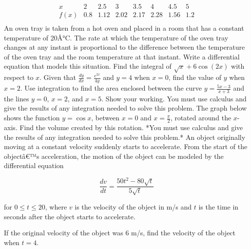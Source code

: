 \documentclass[12pt,addpoints]{exam}
\begin{document}
\begin{questions}
\[
\begin{array}{c|ccccccc}
x & 2 & 2.5 & 3 & 3.5 & 4 & 4.5 & 5 \\
\hline
f(x) & 0.8 & 1.12 & 2.02 & 2.17 & 2.28 & 1.56 & 1.2 \\
\end{array}
\]
\fillwithlines{3cm}
\question[5] An oven tray is taken from a hot oven and placed in a room that has a constant temperature of 20Â°C. The rate at which the temperature of the oven tray changes at any instant is proportional to the difference between the temperature of the oven tray and the room temperature at that instant. Write a differential equation that models this situation.
\fillwithlines{3cm}
\question[5] Find the integral of \(\sqrt{x} + 6 \cos(2x)\) with respect to \(x\).
\fillwithlines{3cm}
\question[5] Given that \(\frac{dy}{dx} = \frac{e^{2x}}{4y}\) and \(y = 4\) when \(x = 0\), find the value of \(y\) when \(x = 2\).
\fillwithlines{3cm}
\question[5] Use integration to find the area enclosed between the curve \( y = \frac{5x - 3}{x + 3} \) and the lines \( y = 0 \), \( x = 2 \), and \( x = 5 \). Show your working. You must use calculus and give the results of any integration needed to solve this problem.
\fillwithlines{3cm}
\question[5] The graph below shows the function \( y = \cos x \), between \( x = 0 \) and \( x = \frac{\pi}{2} \), rotated around the \( x \)-axis. Find the volume created by this rotation. *You must use calculus and give the results of any integration needed to solve this problem.*
\fillwithlines{3cm}
\question[5] An object originally moving at a constant velocity suddenly starts to accelerate. From the start of the objectâ€™s acceleration, the motion of the object can be modeled by the differential equation

\[ \frac{dv}{dt} = \frac{50t^2 - 80\sqrt{t}}{5\sqrt{t}} \]

for \( 0 \leq t \leq 20 \), where \( v \) is the velocity of the object in m/s and \( t \) is the time in seconds after the object starts to accelerate.

If the original velocity of the object was 6 m/s, find the velocity of the object when \( t = 4 \).


\end{questions}
\end{document}

